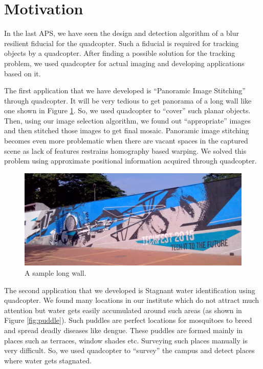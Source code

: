 \documentclass[11pt]{article}
\def\baselinestretch{1.15}
\begin{document}
\newpage

\section{Motivation}
In the last APS, we have seen the design and detection algorithm of a blur
resilient fiducial for the quadcopter. Such a fiducial is required for tracking objects by
a quadcopter. After finding a possible solution for the tracking problem, we
used quadcopter for actual imaging and developing applications based on it.

The first application that we have developed is ``Panoramic Image Stitching''
through quadcopter. It will be very tedious to get panorama of a long wall like one
shown in Figure \ref{fig:wall}. So, we used quadcopter to ``cover'' such planar
objects. Then, using our image selection algorithm, we found out ``appropriate'' images
and then stitched those images to get final mosaic. Panoramic image stitching
becomes even more problematic when there are vacant spaces in the captured
scene as lack of features restrains homography based warping. We solved this
problem using approximate positional information acquired through quadcopter.

\begin{figure}[ht!]
 \centering
  \includegraphics[width=\linewidth]{IMG_20150415_155624.jpg}
  \caption{A sample long wall.}
  \label{fig:wall}
\end{figure}

The second application that we developed is Stagnant water identification
using quadcopter. We found many locations in our institute  which do not attract
much attention but water gets easily accumulated around such areas (as shown in
Figure \ref{fig:puddle}). Such puddles are perfect locations for mosquitoes to
breed and spread deadly diseases like dengue. These puddles are formed mainly in
places such as terraces, window shades etc. Surveying such places manually is
very difficult. So, we used quadcopter to ``survey'' the campus and detect
places where water gets stagnated.
\end{document}
